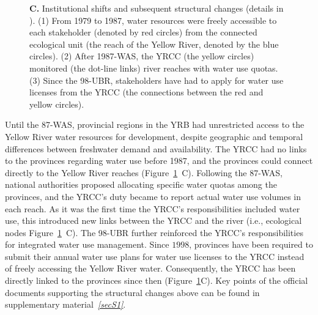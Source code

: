 \documentclass[preprint, 12pt]{elsarticle}
\begin{document}
\begin{figure}[!t]
{		\textbf{C.} Institutional shifts and subsequent structural changes (details in \textit{}). (1) From 1979 to 1987, water resources were freely accessible to each stakeholder (denoted by red circles) from the connected ecological unit (the reach of the Yellow River, denoted by the blue circles). (2) After 1987-WAS, the YRCC (the yellow circles) monitored (the dot-line links) river reaches with water use quotas. (3) Since the 98-UBR, stakeholders have had to apply for water use licenses from the YRCC (the connections between the red and yellow circles).
	}\label{fig:structure}
\end{figure}

Until the 87-WAS, provincial regions in the YRB had unrestricted access to the Yellow River water resources for development, despite geographic and temporal differences between freshwater demand and availability.
The YRCC had no links to the provinces regarding water use before 1987, and the provinces could connect directly to the Yellow River reaches (Figure~\ref{fig:structure}~C).
Following the 87-WAS, national authorities proposed allocating specific water quotas among the provinces, and the YRCC's duty became to report actual water use volumes in each reach.
As it was the first time the YRCC's responsibilities included water use, this introduced new links between the YRCC and the river (i.e., ecological nodes Figure~\ref{fig:structure}~C).
The 98-UBR further reinforced the YRCC's responsibilities for integrated water use management.
Since $1998$, provinces have been required to submit their annual water use plans for water use licenses to the YRCC instead of freely accessing the Yellow River water.
Consequently, the YRCC has been directly linked to the provinces since then (Figure~\ref{fig:structure}C).
Key points of the official documents supporting the structural changes above can be found in supplementary material~\textit{\ref{secS1}}.
\end{document}
